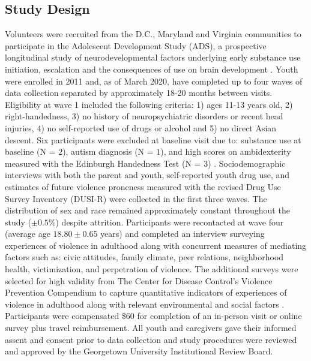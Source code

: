 \documentclass[utf8]{article}
\begin{document}
\subsection*{Study Design} 
Volunteers were recruited from the D.C., Maryland and Virginia communities to participate in the Adolescent Development Study (ADS), a prospective longitudinal study of neurodevelopmental factors underlying early substance use initiation, escalation and the consequences of use on brain development \citep{Fishbein2016}. Youth were enrolled in 2011 and, as of March 2020, have completed up to four waves of data collection separated by approximately 18-20 months between visits. Eligibility at wave 1 included the following criteria: 1) ages 11-13 years old, 2) right-handedness, 3) no history of neuropsychiatric disorders or recent head injuries, 4) no self-reported use of drugs or alcohol and 5) no direct Asian descent. Six participants were excluded at baseline visit due to: substance use at baseline (N = $2$), autism diagnosis (N = $1$), and high scores on ambidexterity measured with the Edinburgh Handedness Test (N = $3$) \citep{veale2014edinburgh}. Sociodemographic interviews with both the parent and youth, self-reported youth drug use, and estimates of future violence proneness measured with the revised Drug Use Survey Inventory (DUSI-R) \citep{tarter1994reliability} were collected in the first three waves. The distribution of sex and race remained approximately constant throughout the study ($\pm0.5\%$) despite attrition. Participants were recontacted at wave four (average age $18.80\pm0.65$ years) and completed an interview surveying experiences of violence in adulthood along with concurrent measures of mediating factors such as: civic attitudes, family climate, peer relations, neighborhood health, victimization, and perpetration of violence. The additional surveys were selected for high validity from The Center for Disease Control’s Violence Prevention Compendium to capture quantitative indicators of experiences of violence in adulthood along with relevant environmental and social factors \citep{dahlberg2005measuring}. Participants were compensated \$$60$ for completion of an in-person visit or online survey plus travel reimbursement. All youth and caregivers gave their informed assent and consent prior to data collection and study procedures were reviewed and approved by the Georgetown University Institutional Review Board.
\end{document}
